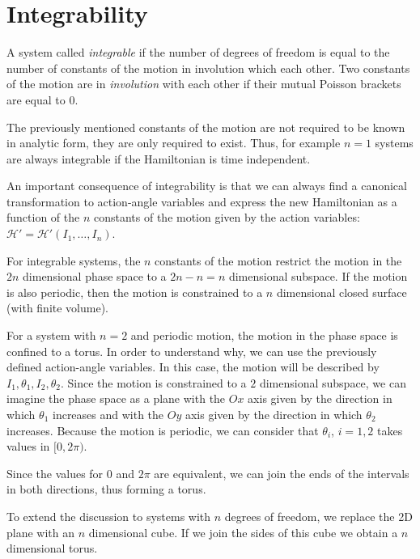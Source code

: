 \documentclass[../thesis.tex]{subfiles}
\theoremstyle{plain}
\begin{document}
\section{Integrability}

A system called \emph{integrable} if the number of degrees of freedom is equal to the number
of constants of the motion in involution which each other. Two constants of the motion
are in \emph{involution} with each other if their mutual Poisson brackets are equal to \(0\).

The previously mentioned constants of the motion are not required to be known in analytic form,
they are only required to exist. Thus, for example \(n=1\) systems are always integrable if
the Hamiltonian is time independent.

An important consequence of integrability is that we can always find a canonical
transformation to action-angle variables and express the new Hamiltonian as a function
of the \(n\) constants of the motion given by the action variables:
\(\mathcal{H'}=\mathcal{H'}(I_1,\dotsc,I_n)\).

For integrable systems, the \(n\) constants of the motion restrict the motion in the
\(2n\) dimensional phase space to a \(2n-n=n\) dimensional subspace. If the motion is
also periodic, then the motion is constrained to a \(n\) dimensional closed surface
(with finite volume).

For a system with \(n=2\) and periodic motion, the motion in the phase space is confined
to a torus. In order to understand why, we can use the previously defined action-angle variables.
In this case, the motion will be described by \(I_1, \theta_1, I_2, \theta_2\).
Since the motion is constrained to a \(2\) dimensional subspace, we can imagine the phase space
as a plane with the \(Ox\) axis given by the direction in which \(\theta_1\) increases and
with the \(Oy\) axis given by the direction in which \(\theta_2\) increases. Because the motion
is periodic, we can consider that \(\theta_i\), \(i=1,2\) takes values in \([0,2\pi)\).    %

Since the values for \(0\) and \(2\pi \) are equivalent, we can join the ends of the
intervals in both directions, thus forming a torus.

To extend the discussion to systems with \(n\) degrees of freedom,
we replace the 2D plane with an \(n\) dimensional cube. If we join the sides of
this cube we obtain a \(n\) dimensional torus.

%
\end{document}
